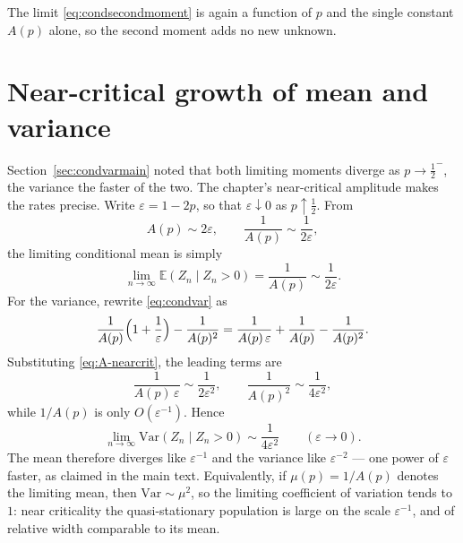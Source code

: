 \documentclass[11pt]{article}
\begin{document}
The limit \eqref{eq:condsecondmoment} is again a function of $p$ and the single constant $A(p)$ alone, so the second moment adds no new unknown.

\section{Near-critical growth of mean and variance}
\label{app:nearcritmoments}

Section~\ref{sec:condvarmain} noted that both limiting moments diverge as
$p\to\tfrac12^-$, the variance the faster of the two. The chapter's near-critical
amplitude makes the rates precise. Write $\varepsilon=1-2p$, so that
$\varepsilon\downarrow0$ as $p\uparrow\tfrac12$. From
\begin{equation}
\label{eq:A-nearcrit}
A(p)\sim 2\varepsilon,
\qquad
\frac1{A(p)}\sim\frac1{2\varepsilon},
\end{equation}
the limiting conditional mean is simply
\begin{equation}
\label{eq:mean-nearcrit}
\lim_{n\to\infty}\mathbb{E}(Z_n\mid Z_n>0)
= \frac1{A(p)}
\sim \frac1{2\varepsilon}.
\end{equation}
For the variance, rewrite \eqref{eq:condvar} as
\[
\frac1{A(p)}\Bigl(1+\frac1\varepsilon\Bigr)
- \frac1{A(p)^2}
= \frac1{A(p)\,\varepsilon}
+ \frac1{A(p)}
- \frac1{A(p)^2}.
\]
Substituting \eqref{eq:A-nearcrit}, the leading terms are
\[
\frac1{A(p)\,\varepsilon}
\sim \frac1{2\varepsilon^2},
\qquad
\frac1{A(p)^2}
\sim \frac1{4\varepsilon^2},
\]
while $1/A(p)$ is only $O(\varepsilon^{-1})$. Hence
\begin{equation}
\label{eq:var-nearcrit}
\lim_{n\to\infty}\mathrm{Var}(Z_n\mid Z_n>0)
\sim \frac1{4\varepsilon^2}
\qquad(\varepsilon\to0).
\end{equation}
The mean therefore diverges like $\varepsilon^{-1}$ and the variance like
$\varepsilon^{-2}$ --- one power of $\varepsilon$ faster, as claimed in the main
text. Equivalently, if $\mu(p)=1/A(p)$ denotes the limiting mean, then
$\mathrm{Var}\sim\mu^2$, so the limiting coefficient of variation tends to~$1$:
near criticality the quasi-stationary population is large on the scale
$\varepsilon^{-1}$, and of relative width comparable to its mean.
\end{document}
